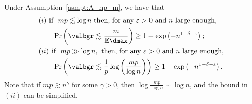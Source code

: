 \begin{theorem}
    \label{thm:alg_solution_ub}
        Under Assumption~\ref{asmpt:A_np_m}, we have that
        \begin{equation}
            \begin{aligned}
                &(i) \text{ if } \  mp \lesssim \log n \  \text{then, for any } \varepsilon >0\text{ and } n \text{ large enough},\\ 
                &\qquad \Pr\left(\valbgr \lesssim \frac{m}{\mathbb{E}\dmax}\right) \geq 1 - \exp\left(-n^{1 - \delta - \varepsilon}\right); \\
                &(ii) \text{ if } \ mp \gg \log n, \text{ then, for any } \varepsilon > 0 \text{ and } n \text{ large enough}, \\
                &\qquad\Pr\left(\valbgr \lesssim \frac{1}{p} \log\left(\frac{mp}{\log n}\right)\right) \geq 1 - \exp\left(-n^{1 - \delta - \varepsilon}\right). \\
            \end{aligned}
        \end{equation}
        Note that if \(mp \gtrsim n^{\gamma}\) for some \(\gamma > 0\), then \(\log \frac{mp}{\log n} \sim \log n\), and the bound in \((ii)\) can be simplified.
\end{theorem}
